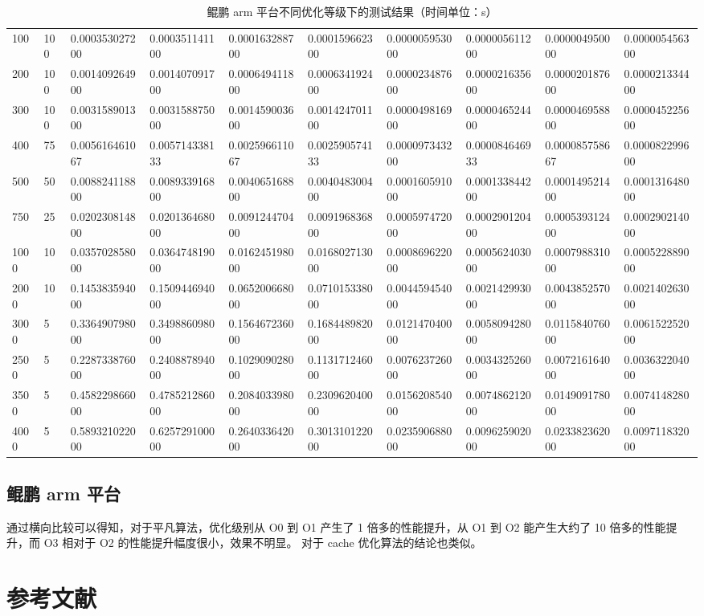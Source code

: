 \documentclass[a4paper]{article}
\begin{document}
\begin{table}[]
{\begin{tabular}{llllllllll}
      100  & 100    & 0.000353027200 & 0.000351141100 & 0.000163288700 & 0.000159662300 & 0.000005953000 & 0.000005611200 & 0.000004950000 & 0.000005456300 \\
      200  & 100    & 0.001409264900 & 0.001407091700 & 0.000649411800 & 0.000634192400 & 0.000023487600 & 0.000021635600 & 0.000020187600 & 0.000021334400 \\
      300  & 100    & 0.003158901300 & 0.003158875000 & 0.001459003600 & 0.001424701100 & 0.000049816900 & 0.000046524400 & 0.000046958800 & 0.000045225600 \\
      400  & 75     & 0.005616461067 & 0.005714338133 & 0.002596611067 & 0.002590574133 & 0.000097343200 & 0.000084646933 & 0.000085758667 & 0.000082299600 \\
      500  & 50     & 0.008824118800 & 0.008933916800 & 0.004065168800 & 0.004048300400 & 0.000160591000 & 0.000133844200 & 0.000149521400 & 0.000131648000 \\
      750  & 25     & 0.020230814800 & 0.020136468000 & 0.009124470400 & 0.009196836800 & 0.000597472000 & 0.000290120400 & 0.000539312400 & 0.000290214000 \\
      1000 & 10     & 0.035702858000 & 0.036474819000 & 0.016245198000 & 0.016802713000 & 0.000869622000 & 0.000562403000 & 0.000798831000 & 0.000522889000 \\
      2000 & 10     & 0.145383594000 & 0.150944694000 & 0.065200668000 & 0.071015338000 & 0.004459454000 & 0.002142993000 & 0.004385257000 & 0.002140263000 \\
      3000 & 5      & 0.336490798000 & 0.349886098000 & 0.156467236000 & 0.168448982000 & 0.012147040000 & 0.005809428000 & 0.011584076000 & 0.006152252000 \\
      2500 & 5      & 0.228733876000 & 0.240887894000 & 0.102909028000 & 0.113171246000 & 0.007623726000 & 0.003432526000 & 0.007216164000 & 0.003632204000 \\
      3500 & 5      & 0.458229866000 & 0.478521286000 & 0.208403398000 & 0.230962040000 & 0.015620854000 & 0.007486212000 & 0.014909178000 & 0.007414828000 \\
      4000 & 5      & 0.589321022000 & 0.625729100000 & 0.264033642000 & 0.301310122000 & 0.023590688000 & 0.009625902000 & 0.023382362000 & 0.009711832000
    \end{tabular}%
  }
  \caption{鲲鹏 arm 平台不同优化等级下的测试结果（时间单位：s）}
  \label{tab:arm-test}
\end{table}

\subsection{鲲鹏 arm 平台}
通过横向比较可以得知，对于平凡算法，优化级别从 O0 到 O1 产生了 1 倍多的性能提升，从 O1 到 O2 能产生大约了 10 倍多的性能提升，而 O3 相对于 O2 的性能提升幅度很小，效果不明显。
对于 cache 优化算法的结论也类似。


\newpage

\section{参考文献}
\cite{1}\cite{2}\cite{3}\cite{4}\cite{5}\cite{6}



\end{document}

